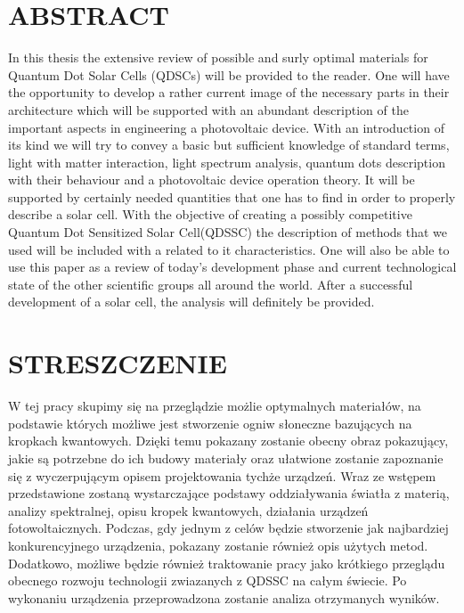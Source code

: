 \documentclass[12pt,twoside]{report}
\numberwithin{equation}{subsection}
\begin{document}
\graphicspath{ {images/} }

\newpage

\begingroup

\let\clearpage\relax
\chapter*{\textbf{ABSTRACT}}

In this thesis the extensive review of possible and surly optimal materials for Quantum Dot Solar Cells (QDSCs) will be provided to the reader. One will have the opportunity to develop a rather current image of the necessary parts in their architecture which will be supported with an abundant description of the important aspects in engineering a photovoltaic device. With an introduction of its kind we will try to convey a basic but sufficient knowledge of standard terms, light with matter interaction, light spectrum analysis, quantum dots description with their behaviour and a photovoltaic device operation theory. It will be supported by certainly needed quantities that one has to find in order to properly describe a solar cell. With the objective of creating a possibly competitive Quantum Dot Sensitized Solar Cell(QDSSC) the description of methods that we used will be included with a related to it characteristics. One will also be able to use this paper as a review of today's development phase and current technological state of the other scientific groups all around the world.  After a successful development of a solar cell, the analysis will definitely be provided.

\chapter*{STRESZCZENIE}

W tej pracy skupimy się na przeglądzie możlie optymalnych materiałów, na podstawie których możliwe jest stworzenie ogniw słoneczne bazujących na kropkach kwantowych. Dzięki temu pokazany zostanie obecny obraz pokazujący, jakie są potrzebne do ich budowy materiały oraz ułatwione zostanie zapoznanie się z wyczerpującym opisem projektowania tychże urządzeń. Wraz ze wstępem przedstawione zostaną wystarczające podstawy oddziaływania światła z materią, analizy spektralnej, opisu kropek kwantowych, działania urządzeń fotowoltaicznych. Podczas, gdy jednym z celów będzie stworzenie jak najbardziej konkurencyjnego urządzenia, pokazany zostanie również opis użytych metod. Dodatkowo, możliwe będzie również traktowanie pracy jako krótkiego przeglądu obecnego rozwoju technologii zwiazanych z QDSSC na całym świecie. Po wykonaniu urządzenia przeprowadzona zostanie analiza otrzymanych wyników.
\end{document}
